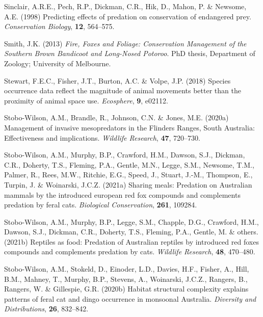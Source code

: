 \documentclass[]{elsarticle} %
\begin{document}
\leavevmode\hypertarget{ref-sinclair1998predicting}{}%
Sinclair, A.R.E., Pech, R.P., Dickman, C.R., Hik, D., Mahon, P. \& Newsome, A.E. (1998) Predicting effects of predation on conservation of endangered prey. \emph{Conservation Biology}, \textbf{12}, 564--575.

\leavevmode\hypertarget{ref-smith2013fire}{}%
Smith, J.K. (2013) \emph{Fire, Foxes and Foliage: Conservation Management of the Southern Brown Bandicoot and Long-Nosed Potoroo}. PhD thesis, Department of Zoology; University of Melbourne.

\leavevmode\hypertarget{ref-stewart2018species}{}%
Stewart, F.E.C., Fisher, J.T., Burton, A.C. \& Volpe, J.P. (2018) Species occurrence data reflect the magnitude of animal movements better than the proximity of animal space use. \emph{Ecosphere}, \textbf{9}, e02112.

\leavevmode\hypertarget{ref-stobo2020management}{}%
Stobo-Wilson, A.M., Brandle, R., Johnson, C.N. \& Jones, M.E. (2020a) Management of invasive mesopredators in the Flinders Ranges, South Australia: Effectiveness and implications. \emph{Wildlife Research}, \textbf{47}, 720--730.

\leavevmode\hypertarget{ref-stobo2021sharing}{}%
Stobo-Wilson, A.M., Murphy, B.P., Crawford, H.M., Dawson, S.J., Dickman, C.R., Doherty, T.S., Fleming, P.A., Gentle, M.N., Legge, S.M., Newsome, T.M., Palmer, R., Rees, M.W., Ritchie, E.G., Speed, J., Stuart, J.-M., Thompson, E., Turpin, J. \& Woinarski, J.C.Z. (2021a) Sharing meals: Predation on Australian mammals by the introduced european red fox compounds and complements predation by feral cats. \emph{Biological Conservation}, \textbf{261}, 109284.

\leavevmode\hypertarget{ref-stobo2021reptiles}{}%
Stobo-Wilson, A.M., Murphy, B.P., Legge, S.M., Chapple, D.G., Crawford, H.M., Dawson, S.J., Dickman, C.R., Doherty, T.S., Fleming, P.A., Gentle, M. \& others. (2021b) Reptiles as food: Predation of Australian reptiles by introduced red foxes compounds and complements predation by cats. \emph{Wildlife Research}, \textbf{48}, 470--480.

\leavevmode\hypertarget{ref-stobo2020habitat}{}%
Stobo-Wilson, A.M., Stokeld, D., Einoder, L.D., Davies, H.F., Fisher, A., Hill, B.M., Mahney, T., Murphy, B.P., Stevens, A., Woinarski, J.C.Z., Rangers, B., Rangers, W. \& Gillespie, G.R. (2020b) Habitat structural complexity explains patterns of feral cat and dingo occurrence in monsoonal Australia. \emph{Diversity and Distributions}, \textbf{26}, 832--842.
\end{document}
